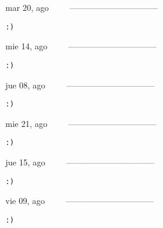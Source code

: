 \documentclass[letterpaper,10pt]{article}
\begin{document}
\begin{multicols}{3}
{mar 20, ago\ \ \ \ \ --------------------------------}
\begin{flushright}\begin{small}\texttt{:)}\end{small}\end{flushright}
\vfill
{mie 14, ago\ \ \ \ \ --------------------------------}
\begin{flushright}\begin{small}\texttt{:)}\end{small}\end{flushright}\par
\vfill
{jue 08, ago\ \ \ \ \ --------------------------------}
\begin{flushright}\begin{small}\texttt{:)}\end{small}\end{flushright}\par
\vfill
\end{multicols}
\vspace{1.05cm}

\begin{multicols}{3}
{mie 21, ago\ \ \ \ \ --------------------------------}
\begin{flushright}\begin{small}\texttt{:)}\end{small}\end{flushright}
\vfill
{jue 15, ago\ \ \ \ \ --------------------------------}
\begin{flushright}\begin{small}\texttt{:)}\end{small}\end{flushright}\par
\vfill
{vie 09, ago\ \ \ \ \ --------------------------------}
\begin{flushright}\begin{small}\texttt{:)}\end{small}\end{flushright}\par
\vfill
\end{multicols}
\vspace{1.05cm}
\end{document}
